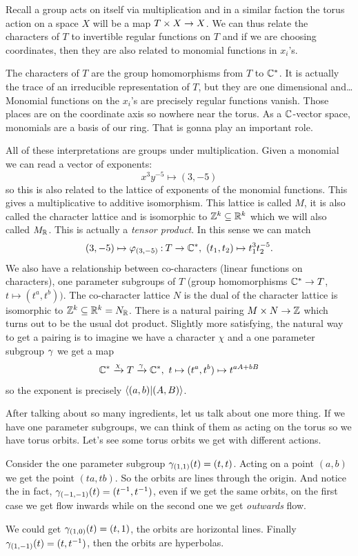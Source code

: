 \documentclass[12pt]{memoir}
\theoremstyle{definition}
\begin{document}
Recall a group acts on itself via multiplication and in a similar faction the torus action on a space $X$ will be a map $T\times X\to X$. We can thus relate the characters of $T$ to invertible regular functions on $T$ and if we are choosing coordinates, then they are also related to monomial functions in $x_i$'s.\par 
The characters of $T$ are the group homomorphisms from $T$ to $\mathbb{C}^\ast$. It is actually the trace of an irreducible representation of $T$, but they are one dimensional and\dots Monomial functions on the $x_i$'s are precisely regular functions vanish. Those places are on the coordinate axis so nowhere near the torus. As a $\mathbb{C}$-vector space, monomials are a basis of our ring. That is gonna play an important role.\par 
All of these interpretations are groups under multiplication. Given a monomial we can read a vector of exponents: 
$$x^3y^{-5}\mapsto (3,-5)$$
so this is also related to the lattice of exponents of the monomial functions. This gives a multiplicative to additive isomorphism. This lattice is called $M$, it is also called the character lattice and is isomorphic to $\mathbb{Z}^k\subseteq \mathbb{R}^k$ which we will also called $M_{\mathbb{R}}$. This is actually a \emph{tensor product}. In this sense we can match 
$$(3,-5)\mapsto \vf_{(3,-5)}\: T\to\bC^\ast,\ (t_1,t_2)\mapsto t_1^3t_2^{-5}.$$
We also have a relationship between co-characters (linear functions on characters), one parameter subgroups of $T$ (group homomorphisms $\mathbb{C}^\ast\to T$, $t\mapsto(t^a,t^b))$. The co-character lattice $N$ is the dual of the character lattice is isomorphic to $\mathbb{Z}^k\subseteq\mathbb{R}^k=N_{\mathbb{R}}$. There is a natural pairing $M\times N\to\mathbb{Z}$ which turns out to be the usual dot product. Slightly more satisfying, the natural way to get a pairing is to imagine we have a character $\chi$ and a one parameter subgroup $\gamma$ we get a map 
$$\bC^\ast\xrightarrow[]{\chi}T\xrightarrow[]{\ga}\bC^\ast,\ t\mapsto(t^a,t^b)\mapsto t^{aA+bB}$$
so the exponent is precisely $\braket{(a,b)}{(A,B)}$.\par
After talking about so many ingredients, let us talk about one more thing. If we have one parameter subgroups, we can think of them as acting on the torus so we have torus orbits. Let's see some torus orbits we get with different actions. 

\begin{Ex}
    Consider the one parameter subgroup $\gamma_{(1,1)}(t)=(t,t)$. Acting on a point $(a,b)$ we get the point $(ta,tb)$. So the orbits are lines through the origin. And notice the in fact, $\gamma_{(-1,-1)}(t)=(t^{-1},t^{-1})$, even if we get the same orbits, on the first case we get flow inwards while on the second one we get \emph{outwards} flow.\par 
    We could get $\gamma_{(1,0)}(t)=(t,1)$, the orbits are horizontal lines. Finally $\gamma_{(1,-1)}(t)=(t,t^{-1})$, then the orbits are hyperbolas. 
\end{Ex}
\end{document}
